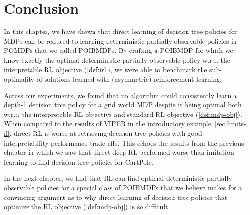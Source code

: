 \section{Conclusion}
In this chapter, we have shown that direct learning of decision tree policies for MDPs can be reduced to learning deterministic partially observable policies in POMDPs that we called POIBMDPs.
By crafting a POIBMDP for which we know exactly the optimal deterministic partially observable policy w.r.t. the interpretable RL objective (\ref{def:irl}), we were able to benchmark the sub-optimality of solutions learned with (asymmetric) reinforcement learning.

Across our experiments, we found that no algorithm could consistently learn a depth-1 decision tree policy for a grid world MDP despite it being optimal both w.r.t. the interpretable RL objective and standard RL objective (\ref{def:mdp-obj}).
When compared to the results of VIPER in the introductory example~\ref{sec:limits-il}, direct RL is worse at retrieving decision tree policies with good interpretability-performance trade-offs.
This echoes the results from the previous chapter in which we saw that direct deep RL performed worse than imitation learning to find decision tree policies for CartPole.

In the next chapter, we find that RL can find optimal deterministic partially observable policies for a special class of POIBMDPs that we believe makes for a convincing argument as to why direct learning of decision tree policies that optimize the RL objective (\ref{def:mdp-obj}) is so difficult.
